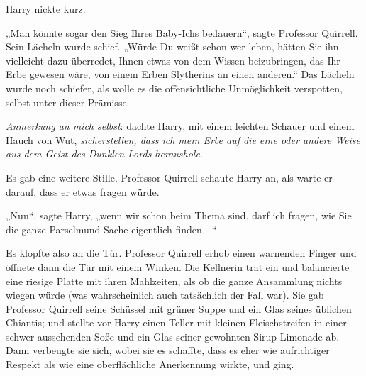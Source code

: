 Harry nickte kurz.

„Man könnte sogar den Sieg Ihres Baby-Ichs bedauern“, sagte Professor Quirrell. Sein Lächeln wurde schief. „Würde Du-weißt-schon-wer leben, hätten Sie ihn vielleicht dazu überredet, Ihnen etwas von dem Wissen beizubringen, das Ihr Erbe gewesen wäre, von einem Erben Slytherins an einen anderen.“ Das Lächeln wurde noch schiefer, als wolle es die offensichtliche Unmöglichkeit verspotten, selbst unter dieser Prämisse.

\emph{Anmerkung an mich selbst}: dachte Harry, mit einem leichten Schauer und einem Hauch von Wut, \emph{sicherstellen, dass ich mein Erbe auf die eine oder andere Weise aus dem Geist des Dunklen Lords heraushole}.

Es gab eine weitere Stille. Professor Quirrell schaute Harry an, als warte er darauf, dass er etwas fragen würde.

„Nun“, sagte Harry, „wenn wir schon beim Thema sind, darf ich fragen, wie Sie die ganze Parselmund-Sache eigentlich finden—“

Es klopfte also an die Tür. Professor Quirrell erhob einen warnenden Finger und öffnete dann die Tür mit einem Winken. Die Kellnerin trat ein und balancierte eine riesige Platte mit ihren Mahlzeiten, als ob die ganze Ansammlung nichts wiegen würde (was wahrscheinlich auch tatsächlich der Fall war). Sie gab Professor Quirrell seine Schüssel mit grüner Suppe und ein Glas seines üblichen Chiantis; und stellte vor Harry einen Teller mit kleinen Fleischstreifen in einer schwer aussehenden Soße und ein Glas seiner gewohnten Sirup Limonade ab. Dann verbeugte sie sich, wobei sie es schaffte, dass es eher wie aufrichtiger Respekt als wie eine oberflächliche Anerkennung wirkte, und ging.

